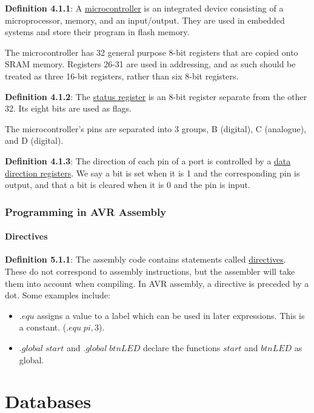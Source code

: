 \documentclass{article}
\newcommand{\separate}[1] {\vspace{#1 pt}\noindent}
\newcommand{\definition}[2]{\textbf{Definition #1}: #2\label{def:#1}}
\begin{document}
\definition{4.1.1}{A \underline{microcontroller} is an integrated device consisting of a microprocessor, memory, and an input/output. They are used in embedded systems and store their program in flash memory.}

\separate{7}The microcontroller has 32 general purpose 8-bit registers that are copied onto SRAM memory. Registers 26-31 are used in addressing, and as such should be treated as three 16-bit registers, rather than six 8-bit registers.

\separate{7}\definition{4.1.2}{The \underline{status register} is an 8-bit register separate from the other 32. Its eight bits are used as flags.}

\separate{7}The microcontroller's pins are separated into 3 groups, B (digital), C (analogue), and D (digital). 

\separate{7}\definition{4.1.3}{The direction of each pin of a port is controlled by a \underline{data direction registers}. We say a bit is set when it is 1 and the corresponding pin is output, and that a bit is cleared when it is 0 and the pin is input.}

\section{Programming in AVR Assembly}

\subsection{Directives}

\definition{5.1.1}{The assembly code contains statements called \underline{directives}. These do not correspond to assembly instructions, but the assembler will take them into account when compiling. In AVR assembly, a directive is preceded by a dot. Some examples include:}
\begin{itemize}
    \item \(.equ\) assigns a value to a label which can be used in later expressions. This is a constant. (\(.equ\;pi, 3\)).
    \item \(.global\;start\) and \(.global\;btnLED\) declare the functions \(start\) and \(btnLED\) as global.
\end{itemize}

\newpage\part{Databases}\label{part:3.db}
\end{document}
